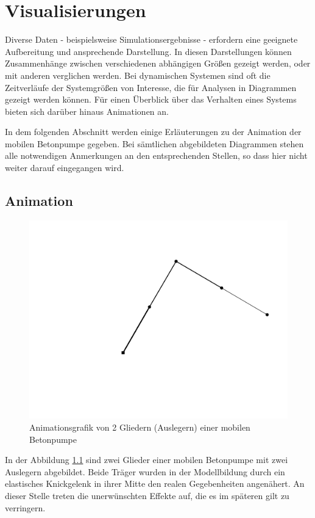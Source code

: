 \chapter{Visualisierungen}

Diverse Daten - beispielsweise Simulationsergebnisse - erfordern eine geeignete Aufbereitung und ansprechende Darstellung. In diesen Darstellungen können Zusammenhänge zwischen verschiedenen abhängigen Größen gezeigt werden, oder mit anderen verglichen werden.
Bei dynamischen Systemen sind oft die Zeitverläufe der Systemgrößen von Interesse, die für Analysen in Diagrammen gezeigt werden können. Für einen Überblick über das Verhalten eines Systems bieten sich darüber hinaus Animationen an.

In dem folgenden Abschnitt werden einige Erläuterungen zu der Animation der mobilen Betonpumpe gegeben. Bei sämtlichen abgebildeten Diagrammen stehen alle notwendigen Anmerkungen an den entsprechenden Stellen, so dass hier nicht weiter darauf eingegangen wird.

\section{Animation}

\begin{figure}[h]
\centering
\includegraphics[width=0.7\linewidth]{animation01}
\caption[Animation Betonpumpe]{Animationsgrafik von 2 Gliedern (Auslegern) einer mobilen Betonpumpe}
\label{fig:animation}
\end{figure}

In der Abbildung \ref{fig:animation} sind zwei Glieder einer mobilen Betonpumpe mit zwei Auslegern abgebildet. Beide Träger wurden in der Modellbildung durch ein elastisches Knickgelenk in ihrer Mitte den realen Gegebenheiten angenähert. An dieser Stelle treten die unerwünschten Effekte auf, die es im späteren gilt zu verringern. 